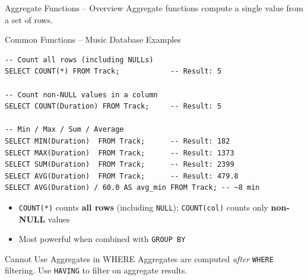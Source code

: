\begin{frame}[fragile]{Aggregate Functions -- Overview}
  Aggregate functions compute a single value from a set of rows.

  \begin{block}{Common Functions -- Music Database Examples}
\begin{lstlisting}[style=sqlstyle]
-- Count all rows (including NULLs)
SELECT COUNT(*) FROM Track;            -- Result: 5

-- Count non-NULL values in a column
SELECT COUNT(Duration) FROM Track;     -- Result: 5

-- Min / Max / Sum / Average
SELECT MIN(Duration)  FROM Track;      -- Result: 182
SELECT MAX(Duration)  FROM Track;      -- Result: 1373
SELECT SUM(Duration)  FROM Track;      -- Result: 2399
SELECT AVG(Duration)  FROM Track;      -- Result: 479.8
SELECT AVG(Duration) / 60.0 AS avg_min FROM Track; -- ~8 min
\end{lstlisting}
  \end{block}

  \begin{itemize}
    \item \texttt{COUNT(*)} counts \textbf{all rows} (including \texttt{NULL});
          \texttt{COUNT(col)} counts only \textbf{non-NULL} values
    \item Most powerful when combined with \texttt{GROUP BY}
  \end{itemize}

  \begin{alertblock}{Cannot Use Aggregates in WHERE}
    Aggregates are computed \emph{after} \texttt{WHERE} filtering.
    Use \texttt{HAVING} to filter on aggregate results.
  \end{alertblock}
\end{frame}

